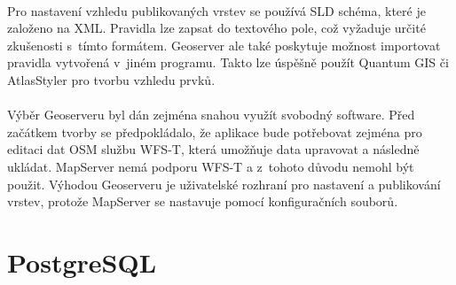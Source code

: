 \documentclass[11pt,a4paper,titlepage,oneside]{book}
\begin{document}

		\paragraph{}Pro nastavení vzhledu publikovaných vrstev se používá \ac{SLD} schéma, které je založeno na  \ac{XML}. Pravidla lze zapsat do textového pole, což vyžaduje určité zkušenosti s~tímto formátem. Geoserver ale také poskytuje možnost importovat pravidla  vytvořená v~jiném programu. Takto lze úspěšně použít Quantum GIS\cite{qgis} či AtlasStyler\cite{atlas} pro tvorbu vzhledu prvků.



		\paragraph{} Výběr Geoserveru byl dán zejména snahou využít svobodný software. Před začátkem tvorby se předpokládalo, že aplikace bude potřebovat zejména pro editaci dat \ac{OSM} službu \ac{WFS-T}, která umožňuje data upravovat a následně ukládat. MapServer nemá podporu \ac{WFS-T} a z~tohoto důvodu nemohl být použit. Výhodou Geoserveru je uživatelské rozhraní pro nastavení a publikování vrstev, protože MapServer se nastavuje pomocí konfiguračních souborů.

	\section{PostgreSQL}





\end{document}
